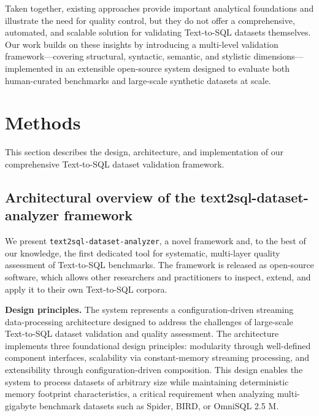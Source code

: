 \documentclass[print]{einformatica}
\begin{document}
Taken together, existing approaches provide important analytical foundations and illustrate the need for quality control, but they do not offer a comprehensive, automated, and scalable solution for validating Text-to-SQL datasets themselves. Our work builds on these insights by introducing a multi-level validation framework---covering structural, syntactic, semantic, and stylistic dimensions---implemented in an extensible open-source system designed to evaluate both human-curated benchmarks and large-scale synthetic datasets at scale.

\section{Methods}\label{sec:Methods}

This section describes the design, architecture, and implementation of our comprehensive Text-to-SQL dataset validation framework.

\subsection{Architectural overview of the text2sql-dataset-analyzer framework}

We present \texttt{text2sql-dataset-analyzer}, a novel framework and, to the best of our knowledge, the first dedicated tool for systematic, multi-layer quality assessment of Text-to-SQL benchmarks. The framework is released as open-source software, which allows other researchers and practitioners to inspect, extend, and apply it to their own Text-to-SQL corpora. 

\textbf{Design principles.} The system represents a configuration-driven streaming data-processing architecture designed to address the challenges of large-scale Text-to-SQL dataset validation and quality assessment. The architecture implements three foundational design principles: modularity through well-defined component interfaces, scalability via constant-memory streaming processing, and extensibility through configuration-driven composition. This design enables the system to process datasets of arbitrary size while maintaining deterministic memory footprint characteristics, a critical requirement when analyzing multi-gigabyte benchmark datasets such as Spider, BIRD, or OmniSQL 2.5 M.
\end{document}
